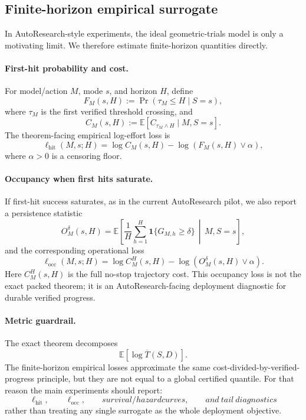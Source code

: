 \documentclass{article}
\newcommand{\E}{\mathbb{E}}
\newcommand{\one}{\mathbf{1}}
\begin{document}
\subsection{Finite-horizon empirical surrogate}

In AutoResearch-style experiments, the ideal geometric-trials model is only a motivating
limit.  We therefore estimate finite-horizon quantities directly.

\paragraph{First-hit probability and cost.}
For model/action \(M\), mode \(s\), and horizon \(H\), define
\[
    F_M(s,H):=\Pr(\tau_M\le H\mid S=s),
\]
where \(\tau_M\) is the first verified threshold crossing, and
\[
    C_M(s,H):=\E[C_{\tau_M\wedge H}\mid M,S=s].
\]
The theorem-facing empirical log-effort loss is
\[
    \ell_{\mathrm{hit}}(M,s;H)
    =
    \log C_M(s,H)-\log(F_M(s,H)\vee\alpha),
\]
where \(\alpha>0\) is a censoring floor.

\paragraph{Occupancy when first hits saturate.}
If first-hit success saturates, as in the current AutoResearch pilot, we also report a
persistence statistic
\[
    O_M^\delta(s,H)
    =
    \E\left[
        \frac1H\sum_{h=1}^H
        \one\{G_{M,h}\ge\delta\}
        \,\middle|\,
        M,S=s
    \right],
\]
and the corresponding operational loss
\[
    \ell_{\mathrm{occ}}(M,s;H)
    =
    \log C_M^H(s,H)-\log(O_M^\delta(s,H)\vee\alpha).
\]
Here \(C_M^H(s,H)\) is the full no-stop trajectory cost.
This occupancy loss is not the exact packed theorem; it is an AutoResearch-facing
deployment diagnostic for durable verified progress.

\paragraph{Metric guardrail.}
The exact theorem decomposes
\[
    \E[\log \overline T(S,D)].
\]
The finite-horizon empirical losses approximate the same cost-divided-by-verified-progress
principle, but they are not equal to a global certified quantile.
For that reason the main experiments should report:
\[
    \ell_{\mathrm{hit}},
    \qquad
    \ell_{\mathrm{occ}},
    \qquad
    survival/hazard curves,
    \qquad
    and\ tail\ diagnostics
\]
rather than treating any single surrogate as the whole deployment objective.
\end{document}
